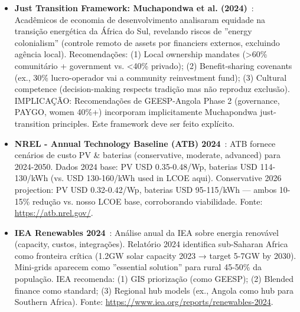 \documentclass[12pt, a4paper]{article}
\begin{document}
{{{{{{{{{{{{\begin{itemize}
  \item \textbf{Just Transition Framework: Muchapondwa et al. (2024)}~\citep{Muchapondwa2024}: Acadêmicos de economia de desenvolvimento analisaram equidade na transição energética da África do Sul, revelando riscos de ''energy colonialism'' (controle remoto de assets por financiers externos, excluindo agência local). Recomendações: (1) Local ownership mandates (>60\% comunitário + government vs. <40\% privado); (2) Benefit-sharing covenants (ex., 30\% lucro-operador vai a community reinvestment fund); (3) Cultural competence (decision-making respects tradição mas não reproduz exclusão). IMPLICAÇÃO: Recomendações de GEESP-Angola Phase 2 (governance, PAYGO, women 40\%+) incorporam implicitamente Muchapondwa just-transition principles. Este framework deve ser feito explícito.

  \item \textbf{NREL - Annual Technology Baseline (ATB) 2024}~\citep{NREL2024}: ATB fornece cenários de custo PV & baterias (conservative, moderate, advanced) para 2024-2050. Dados 2024 base: PV USD 0.35-0.48/Wp, baterias USD 114-130/kWh (vs. USD 130-160/kWh used in LCOE aqui). Conservative 2026 projection: PV USD 0.32-0.42/Wp, baterias USD 95-115/kWh — ambos 10-15\% redução vs. nosso LCOE base, corroborando viabilidade. Fonte: \url{https://atb.nrel.gov/}.
  
  \item \textbf{IEA Renewables 2024}~\citep{IEA2024}: Análise anual da IEA sobre energia renovável (capacity, custos, integrações). Relatório 2024 identifica sub-Saharan Africa como fronteira crítica (1.2GW solar capacity 2023 → target 5-7GW by 2030). Mini-grids aparecem como ''essential solution'' para rural 45-50\% da população. IEA recomenda: (1) GIS priorização (como GEESP); (2) Blended finance como standard; (3) Regional hub models (ex., Angola como hub para Southern Africa). Fonte: \url{https://www.iea.org/reports/renewables-2024}.

\end{itemize}

}}}}}}}}}}}}
\end{document}
